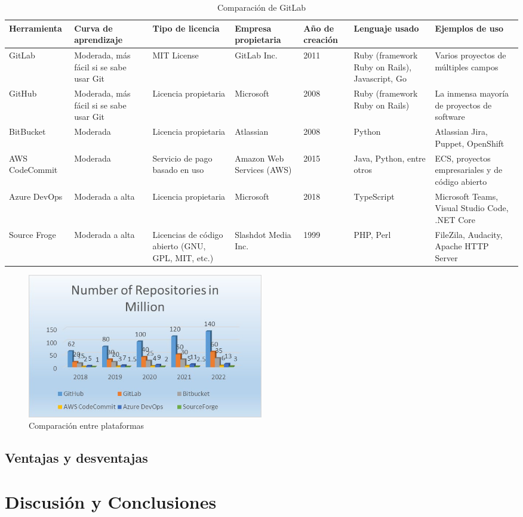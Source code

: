\documentclass[runningheads]{llncs}
\begin{document}
\begin{table}
        \centering
        \caption{Comparación de GitLab}
        \begin{tabularx}{1.1\textwidth}{X || X | X | X | X | X | X}
            Herramienta & Curva de aprendizaje & Tipo de licencia & Empresa propietaria & Año de creación & Lenguaje usado & Ejemplos de uso \\
            \hline
            \hline
            GitLab & Moderada, más fácil si se sabe usar Git & MIT License & GitLab Inc. & 2011 & Ruby (framework Ruby on Rails), Javascript, Go & Varios proyectos de múltiples campos\\
            GitHub & Moderada, más fácil si se sabe usar Git & Licencia propietaria & Microsoft & 2008 & Ruby (framework Ruby on Rails) & La inmensa mayoría de proyectos de software\\
            BitBucket & Moderada & Licencia propietaria & Atlassian & 2008 & Python & Atlassian Jira, Puppet, OpenShift\\
            AWS CodeCommit & Moderada & Servicio de pago basado en uso & Amazon Web Services (AWS) & 2015 & Java, Python, entre otros & ECS, proyectos empresariales y de código abierto\\
            Azure DevOps & Moderada a alta & Licencia propietaria & Microsoft & 2018 & TypeScript & Microsoft Teams, Visual Studio Code, .NET Core\\
            Source Froge & Moderada a alta & Licencias de código abierto (GNU, GPL, MIT, etc.) & Slashdot Media Inc. & 1999 & PHP, Perl & FileZila, Audacity, Apache HTTP Server\\
            \hline
        \end{tabularx}
        \label{table:3}
\end{table}
\begin{figure}[htbp]
        \centering
        \includegraphics[width=0.5\textwidth]{Comp-rep.png}
        \caption{Comparación entre plataformas}
        \label{fig:comp-rep}
\end{figure}
\subsection{Ventajas y desventajas}

\section{Discusión y Conclusiones}


\end{document}
